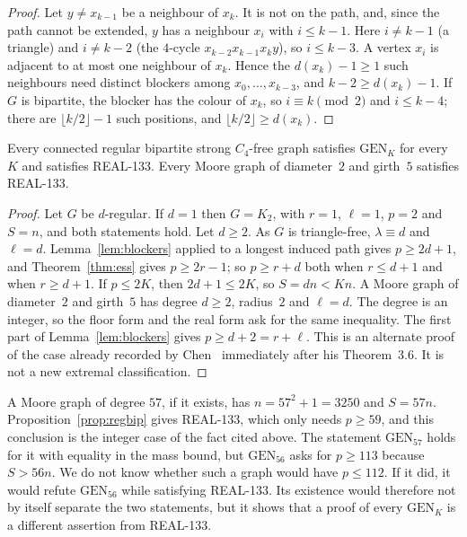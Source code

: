 \documentclass[ASNA]{USG}
\theoremstyle{WBstyletwo}
\numberwithin{equation}{section}
\newcommand{\lr}{\ell}
\newcommand{\pp}{p}
\newcommand{\GEN}{\mathrm{GEN}}
\begin{document}
\begin{proof}
Let $y\ne x_{k-1}$ be a neighbour of $x_k$. It is not on the path, and, since the path cannot be extended, $y$ has a neighbour $x_i$ with $i\le k-1$. Here $i\ne k-1$ (a triangle) and $i\ne k-2$ (the $4$-cycle $x_{k-2}x_{k-1}x_ky$), so $i\le k-3$. A vertex $x_i$ is adjacent to at most one neighbour of $x_k$. Hence the $d(x_k)-1\ge 1$ such neighbours need distinct blockers among $x_0,\dots,x_{k-3}$, and $k-2\ge d(x_k)-1$. If $G$ is bipartite, the blocker has the colour of $x_k$, so $i\equiv k\pmod 2$ and $i\le k-4$; there are $\lfloor k/2\rfloor-1$ such positions, and $\lfloor k/2\rfloor\ge d(x_k)$.
\end{proof}

\begin{proposition}\label{prop:regbip}
Every connected regular bipartite strong $C_4$-free graph satisfies $\GEN_K$ for every $K$ and satisfies REAL-133. Every Moore graph of diameter~$2$ and girth~$5$ satisfies REAL-133.
\end{proposition}

\begin{proof}
Let $G$ be $d$-regular. If $d=1$ then $G=K_2$, with $r=1$, $\lr=1$, $\pp=2$ and $S=n$, and both statements hold. Let $d\ge 2$. As $G$ is triangle-free, $\lambda\equiv d$ and $\lr=d$. Lemma~\ref{lem:blockers} applied to a longest induced path gives $\pp\ge 2d+1$, and Theorem~\ref{thm:ess} gives $\pp\ge 2r-1$; so $\pp\ge r+d$ both when $r\le d+1$ and when $r\ge d+1$. If $\pp\le 2K$, then $2d+1\le 2K$, so $S=dn<Kn$. A Moore graph of diameter~$2$ and girth~$5$ has degree $d\ge 2$, radius~$2$ and $\lr=d$. The degree is an integer, so the floor form and the real form ask for the same inequality. The first part of Lemma~\ref{lem:blockers} gives $\pp\ge d+2=r+\lr$. This is an alternate proof of the case already recorded by Chen~\cite{chen} immediately after his Theorem~3.6. It is not a new extremal classification.
\end{proof}

\begin{remark}\label{rem:moore}
A Moore graph of degree $57$, if it exists, has $n=57^2+1=3250$ and $S=57n$. Proposition~\ref{prop:regbip} gives REAL-133, which only needs $\pp\ge 59$, and this conclusion is the integer case of the fact cited above. The statement $\GEN_{57}$ holds for it with equality in the mass bound, but $\GEN_{56}$ asks for $\pp\ge 113$ because $S>56n$. We do not know whether such a graph would have $\pp\le 112$. If it did, it would refute $\GEN_{56}$ while satisfying REAL-133. Its existence would therefore not by itself separate the two statements, but it shows that a proof of every $\GEN_K$ is a different assertion from REAL-133.
\end{remark}
\end{document}
